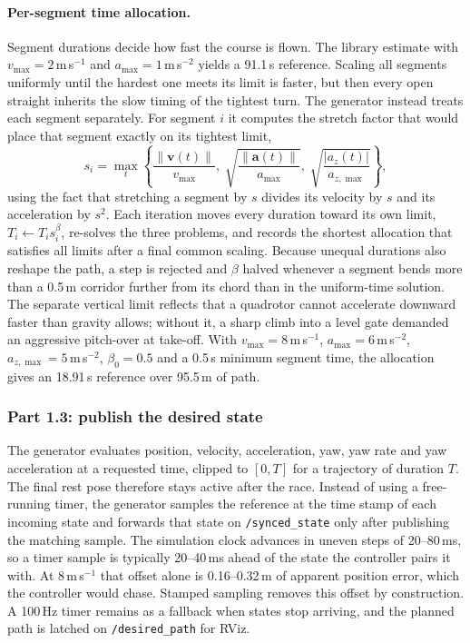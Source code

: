 \documentclass[12pt,a4paper,twoside]{article}
\begin{document}
\paragraph{Per-segment time allocation.}
Segment durations decide how fast the course is flown. The library estimate
with $v_{\max}=2$\,m\,s$^{-1}$ and $a_{\max}=1$\,m\,s$^{-2}$ yields a 91.1\,s
reference. Scaling all segments uniformly until the hardest one meets its limit
is faster, but then every open straight inherits the slow timing of the tightest
turn. The generator instead treats each segment separately. For segment $i$ it
computes the stretch factor that would place that segment exactly on its
tightest limit,
\begin{equation}
s_i=\max_{t}\left\{\frac{\lVert\boldsymbol v(t)\rVert}{v_{\max}},\;
\sqrt{\frac{\lVert\boldsymbol a(t)\rVert}{a_{\max}}},\;
\sqrt{\frac{|a_z(t)|}{a_{z,\max}}}\right\},
\end{equation}
using the fact that stretching a segment by $s$ divides its velocity by $s$ and
its acceleration by $s^2$. Each iteration moves every duration toward its own
limit, $T_i\leftarrow T_i s_i^{\beta}$, re-solves the three problems, and records
the shortest allocation that satisfies all limits after a final common scaling.
Because unequal durations also reshape the path, a step is rejected and $\beta$
halved whenever a segment bends more than a 0.5\,m corridor further from its
chord than in the uniform-time solution. The separate vertical limit reflects
that a quadrotor cannot accelerate downward faster than gravity allows; without
it, a sharp climb into a level gate demanded an aggressive pitch-over at take-off.
With $v_{\max}=8$\,m\,s$^{-1}$, $a_{\max}=6$\,m\,s$^{-2}$, $a_{z,\max}=5$\,m\,s$^{-2}$,
$\beta_0=0.5$ and a 0.5\,s minimum segment time, the allocation gives an
18.91\,s reference over 95.5\,m of path.

\subsubsection{Part 1.3: publish the desired state}
The generator evaluates position, velocity, acceleration, yaw, yaw rate and yaw
acceleration at a requested time, clipped to $[0,T]$ for a trajectory of duration
$T$. The final rest pose therefore stays active after the race. Instead of using
a free-running timer, the generator samples the reference at the time stamp of
each incoming state and forwards that state on \texttt{/synced\_state} only after
publishing the matching sample. The simulation clock advances in uneven steps of
20--80\,ms, so a timer sample is typically 20--40\,ms ahead of the state the
controller pairs it with. At 8\,m\,s$^{-1}$ that offset alone is 0.16--0.32\,m of
apparent position error, which the controller would chase. Stamped sampling
removes this offset by construction. A 100\,Hz timer remains as a fallback when
states stop arriving, and the planned path is latched on \texttt{/desired\_path}
for RViz.
\end{document}
